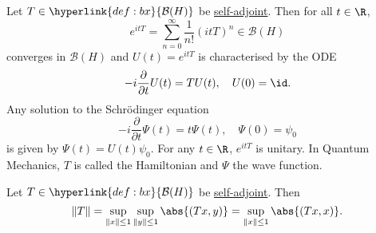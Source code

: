 \documentclass{article}
\begin{document}
\begin{eg}
    Let $T \in \hyperlink{def:bx}{\mathcal{B}(H)}$ be \hyperlink{def:normalMap}{self-adjoint}. Then for all $t \in \R$,
    \begin{equation*}
        e^{itT} = \sum_{n=0}^\infty \frac{1}{n!} (itT)^n \in \mathcal{B}(H)
    \end{equation*}
    converges in $\mathcal{B}(H)$ and $U(t) = e^{itT}$ is characterised by the ODE
    \begin{equation*}
        -i \frac{\partial}{\partial t} U(t) = T U(t), \quad U(0) = \id.
    \end{equation*}
    Any solution to the Schr\"odinger equation
    \begin{equation*}
        -i \frac{\partial}{\partial t} \Psi(t) = t \Psi(t), \quad \Psi(0) = \psi_0
    \end{equation*}
    is given by $\Psi(t) = U(t) \psi_0$. For any $t \in \R$, $e^{itT}$ is unitary.
    In Quantum Mechanics, $T$ is called the Hamiltonian and $\Psi$ the wave function.
\end{eg}

\begin{lemma}
    Let $T \in \hyperlink{def:bx}{\mathcal{B}(H)}$ be \hyperlink{def:normalMap}{self-adjoint}. Then
    \begin{equation*}
        \|T\| = \sup_{\|x\| \leq 1} \sup_{\|y\| \leq 1} \abs{(Tx, y)} = \sup_{\|x\| \leq 1} \abs{(Tx, x)}.
    \end{equation*}
\end{lemma}
\end{document}
